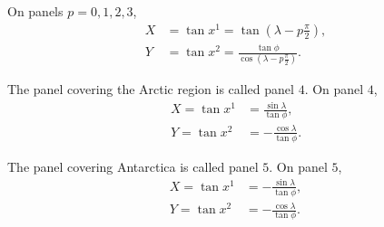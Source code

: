 \documentclass{article}
\begin{document}
On panels $p=0,1,2,3$,
\begin{align}
X&=\tan x^1 = \tan \left( \lambda -p\frac{\pi}{2} \right), \\
Y&=\tan x^2 = \frac{\tan \phi}{\cos \left( \lambda -p\frac{\pi}{2}\right)}.
\end{align}

The panel covering the Arctic region is called panel $4$. On panel $4$,
\begin{align}
X=\tan x^1&= \frac{\sin \lambda}{\tan \phi}, \\
Y=\tan x^2&=- \frac{\cos \lambda}{\tan \phi}.
\end{align}

The panel covering Antarctica is called panel $5$. On panel $5$,
\begin{align}
X=\tan x^1&=- \frac{\sin \lambda}{\tan \phi}, \\
Y=\tan x^2&=- \frac{\cos \lambda}{\tan \phi}.
\end{align}
\end{document}
